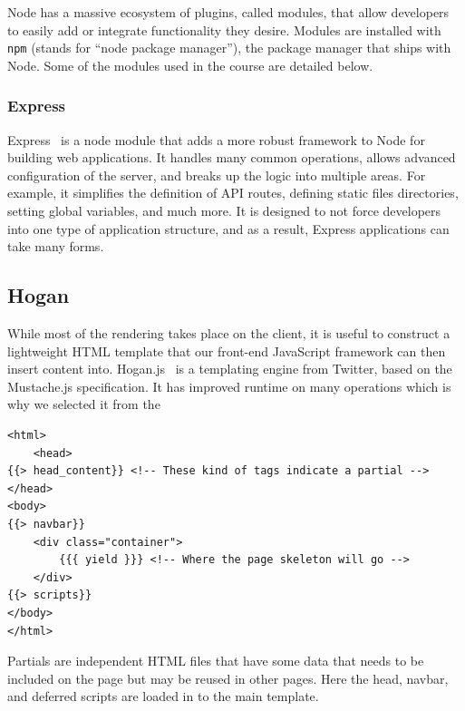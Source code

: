 \documentclass[12pt]{article}
\newcommand{\code}[1]{{\texttt {#1}}}
\begin{document}
Node has a massive ecosystem of plugins, called modules, that allow developers to easily add or integrate functionality they desire. Modules are installed with \code{npm} (stands for ``node package manager''), the package manager that ships with Node. Some of the modules used in the course are detailed below.

\subsubsection{Express}\label{sec:express}
Express~\cite{Express} is a node module that adds a more robust framework to Node for building web applications. It handles many common operations, allows advanced configuration of the server, and breaks up the logic into multiple areas.  For example, it simplifies the definition of API routes, defining static files directories, setting global variables, and much more. It is designed to not force developers into one type of application structure, and as a result, Express applications can take many forms.

\subsection{Hogan}\label{sec:hogan}
While most of the rendering takes place on the client, it is useful to construct a lightweight HTML template that our front-end JavaScript framework can then insert content into. Hogan.js~\cite{Hogan} is a templating engine from Twitter, based on the Mustache.js specification. It has improved runtime on many operations which is why we selected it from the 
\begin{verbatim}
<html>
	<head>
{{> head_content}} <!-- These kind of tags indicate a partial -->
</head>
<body>
{{> navbar}} 
    <div class="container">
        {{{ yield }}} <!-- Where the page skeleton will go -->
    </div>
{{> scripts}}
</body>
</html>
\end{verbatim}
Partials are independent HTML files that have some data that needs to be included on the page but may be reused in other pages. Here the head, navbar, and deferred scripts are loaded in to the main template.
\end{document}

